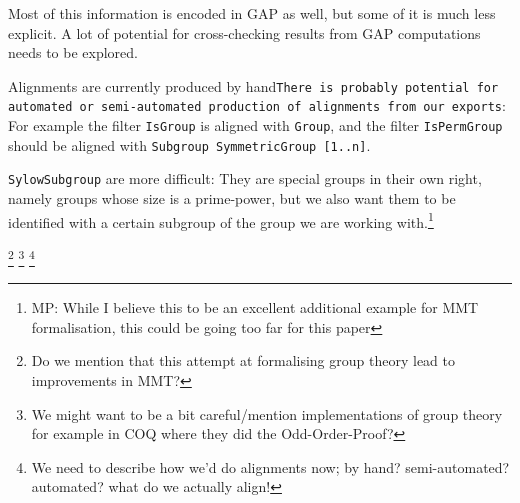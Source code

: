 Most of this information is encoded in GAP as well, but some of it is much less
explicit. A lot of potential for cross-checking results from GAP computations
needs to be explored.

Alignments are currently produced by hand\texttt{There is probably potential for
automated or semi-automated production of alignments from our exports}: For
example the filter \texttt{IsGroup} is aligned with \texttt{Group}, and the
filter \texttt{IsPermGroup} should be aligned with \texttt{Subgroup SymmetricGroup
  [1..n]}.

\texttt{SylowSubgroup} are more difficult: They are special groups in their
own right, namely groups whose size is a prime-power, but we also want them
to be identified with a certain subgroup of the group we are working
with.\footnote{MP: While I believe this to be an excellent additional example
  for MMT formalisation, this could be going too far for this paper}

\footnote{Do we mention that this attempt at formalising group theory lead to
  improvements in MMT?}
\footnote{We might want to be a bit careful/mention implementations of group
  theory for example in COQ where they did the Odd-Order-Proof?}
\footnote{We need to describe how we'd do alignments now; by hand?
  semi-automated? automated? what do we actually align!}
